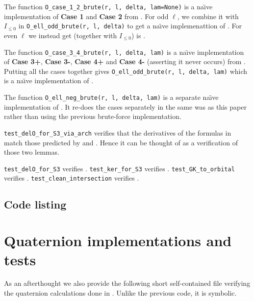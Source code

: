 \begin{enumerate}
\begin{itemize}
      \ii The function \texttt{O\_case\_1\_2\_brute(r, l, delta, lam=None)}
      is a na\"{\i}ve implementation of \textbf{Case 1} and \textbf{Case 2}
      from .
      For odd $\ell$, we combine it with $I_{\le 0}$ in \texttt{O\_ell\_odd\_brute(r, l, delta)}
      to get a na\"{\i}ve implemenattion of .
      For even $\ell$ we instead get (together with $I_{\le 0}$) is .

      \ii The function \texttt{O\_case\_3\_4\_brute(r, l, delta, lam)}
      is a na\"{\i}ve implementation of
      \textbf{Case 3\ts+}, \textbf{Case 3\ts-}, \textbf{Case 4\ts+}
      and \textbf{Case 4\ts-} (asserting it never occurs)
      from .
      Putting all the cases together gives
      \texttt{O\_ell\_odd\_brute(r, l, delta, lam)}
      which is a na\"{\i}ve implementation of .

      \ii The function \texttt{O\_ell\_neg\_brute(r, l, delta, lam)}
      is a separate na\"{\i}ve implementation of .
      It re-does the cases separately in the same was as this paper
      rather than using the previous brute-force implementation.
    \end{itemize}

  \ii \texttt{test\_delO\_for\_S3\_via\_arch} verifies that the derivatives of the formulas in
  match those predicted by  and .
  Hence it can be thought of as a verification of those two lemmas.

  \ii \texttt{test\_delO\_for\_S3} verifies .
  \ii \texttt{test\_ker\_for\_S3} verifies .
  \ii \texttt{test\_GK\_to\_orbital} verifies .
  \ii \texttt{test\_clean\_intersection} verifies .
\end{enumerate}

\subsection{Code listing}

\singlespacing

\doublespacing

\section{Quaternion implementations and tests}
As an afterthought we also provide the following short self-contained file
verifying the quaternion calculations done in .
Unlike the previous code, it is symbolic.

\singlespacing

\doublespacing
